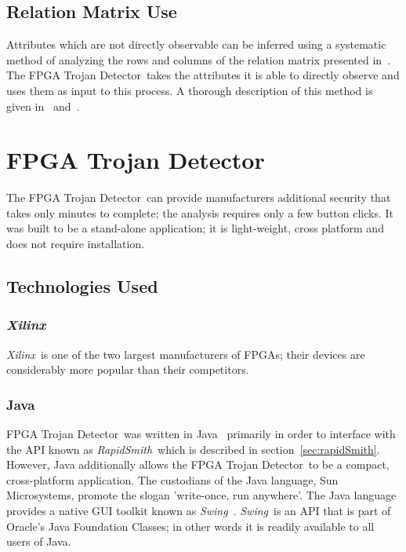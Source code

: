 \documentclass[conference]{IEEEtran}
\newcommand{\Xilinx}{\textit{\gls{Xilinx}}~}
\newcommand{\Name}{\acrshort{FPGA} Trojan Detector}
\newcommand{\NameNoPeriod}{\Name~}
\newcommand{\Swing}{\textit{Swing}~}
\newcommand{\SwingEnd}{\textit{Swing}}
\newcommand{\RapidSmith}{\textit{RapidSmith}~}
\begin{document}
\subsection{Relation Matrix Use} \label{sec:matrixUse}
Attributes which are not directly observable can be inferred using a systematic method of analyzing the rows and columns of the relation matrix presented in~\cite{samerAttribute}.
The \NameNoPeriod takes the attributes it is able to directly observe and uses them as input to this process.
A thorough description of this method is given in~\cite{samerDissertation} and~\cite{meCategorization}.

\section{\Name} \label{sec:implementation}
The \NameNoPeriod can provide manufacturers additional security that takes only minutes to complete; the analysis requires only a few button clicks.
It was built to be a stand-alone application; it is light-weight, cross platform and does not require installation.
\subsection{Technologies Used}
\subsubsection{\textit{Xilinx}}
\Xilinx is one of the two largest manufacturers of \acrshort{FPGA}s; their devices are considerably more popular than their competitors.

\subsubsection{Java} \label{sec:java}
\NameNoPeriod was written in Java~\cite{java} primarily in order to interface with the \acrfull{API} known as \RapidSmith which is described in section~\ref{sec:rapidSmith}.
However, Java additionally allows the \NameNoPeriod to be a compact, cross-platform application.
The custodians of the Java language, Sun Microsystems, promote the slogan 'write-once, run anywhere'. 
The Java language provides a native \acrfull{GUI} toolkit known as \SwingEnd~\cite{swing}.
\Swing is an \acrshort{API} that is part of Oracle's Java Foundation Classes; in other words it is readily available to all users of Java.
\end{document}
